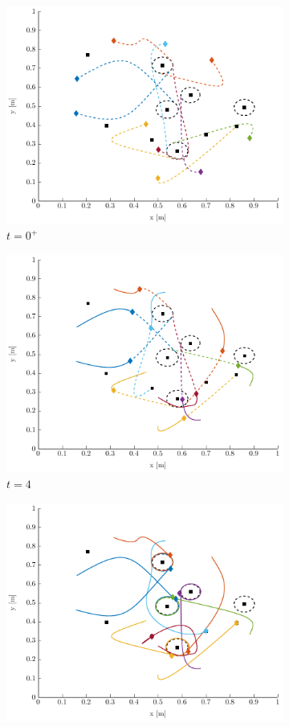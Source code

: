 \documentclass{ifacconf}
\begin{document}
\begin{figure}[h]
\centering
\begin{subfigure}{\linewidth}
  \centering
  \includegraphics[width=0.8\linewidth]{Figures/Alloc_5_5_t_0_CommLimit_1.pdf}
  \caption{$t=0^+$}
  \label{fig:Ex_Im}
\end{subfigure}
\begin{subfigure}{\linewidth}
  \centering
  \includegraphics[width=0.8\linewidth]{Figures/Alloc_5_5_t_4_CommLimit_1.pdf}
  \caption{$t=4$}
  \label{fig:Ex_Im2}
\end{subfigure}
\begin{subfigure}{\linewidth}
  \centering
  \includegraphics[width=0.8\linewidth]{Figures/Alloc_5_5_t_10_CommLimit_1.pdf}

\end{subfigure}
\end{figure}
\end{document}
